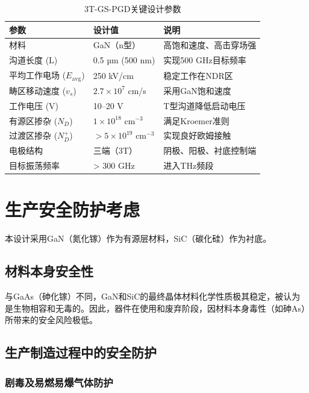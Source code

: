 \documentclass[12pt,a4paper]{article}
\begin{document}
\begin{table}[H]
    \centering
    \caption{3T-GS-PGD关键设计参数}
    \begin{tabular}{p{4.5cm}p{3.5cm}p{5.5cm}}
        \toprule
        \textbf{参数} & \textbf{设计值} & \textbf{说明} \\
        \midrule
        材料 & GaN（n型） & 高饱和速度、高击穿场强 \\
        沟道长度 (L) & 0.5 µm (500 nm) & 实现500 GHz目标频率 \\
        平均工作电场 ($E_{\text{avg}}$) & 250 kV/cm & 稳定工作在NDR区 \\
        畴区移动速度 ($v_s$) & $2.7 \times 10^7$ cm/s & 采用GaN饱和速度 \\
        工作电压 (V) & 10--20 V & T型沟道降低启动电压 \\
        有源区掺杂 ($N_D$) & $1 \times 10^{18}$ cm$^{-3}$ & 满足Kroemer准则 \\
        过渡区掺杂 ($N_D^+$) & $> 5 \times 10^{19}$ cm$^{-3}$ & 实现良好欧姆接触 \\
        电极结构 & 三端（3T） & 阴极、阳极、衬底控制端 \\
        目标振荡频率 & > 300 GHz & 进入THz频段 \\
        \bottomrule
    \end{tabular}
\end{table}

\clearpage

\section{生产安全防护考虑}

本设计采用GaN（氮化镓）作为有源层材料，SiC（碳化硅）作为衬底。

\subsection{材料本身安全性}

与GaAs（砷化镓）不同，GaN和SiC的最终晶体材料化学性质极其稳定，被认为是生物相容和无毒的。因此，器件在使用和废弃阶段，因材料本身毒性（如砷As）所带来的安全风险极低。

\subsection{生产制造过程中的安全防护}

\subsubsection{剧毒及易燃易爆气体防护}
\end{document}
